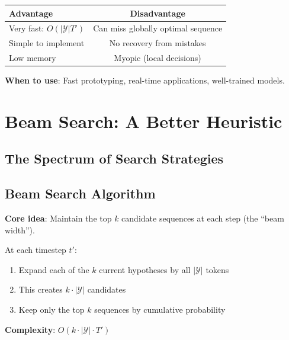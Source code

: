 \documentclass{article}
\begin{document}
\begin{center}
\begin{tabular}{|l|c|}
\hline
\textbf{Advantage} & \textbf{Disadvantage} \\
\hline
Very fast: $O(|\mathcal{Y}| T')$ & Can miss globally optimal sequence \\
Simple to implement & No recovery from mistakes \\
Low memory & Myopic (local decisions) \\
\hline
\end{tabular}
\end{center}

\textbf{When to use}: Fast prototyping, real-time applications, well-trained models.

\section{Beam Search: A Better Heuristic}

\subsection{The Spectrum of Search Strategies}

\begin{center}
\end{center}

\subsection{Beam Search Algorithm}

\textbf{Core idea}: Maintain the top $k$ candidate sequences at each step (the ``beam width'').

\begin{tcolorbox}[colback=green!5!white, colframe=green!50!black, title=Beam Search (Section 10.8.3)]
At each timestep $t'$:
\begin{enumerate}
\item Expand each of the $k$ current hypotheses by all $|\mathcal{Y}|$ tokens
\item This creates $k \cdot |\mathcal{Y}|$ candidates
\item Keep only the top $k$ sequences by cumulative probability
\end{enumerate}

\textbf{Complexity}: $O(k \cdot |\mathcal{Y}| \cdot T')$
\end{tcolorbox}
\end{document}
